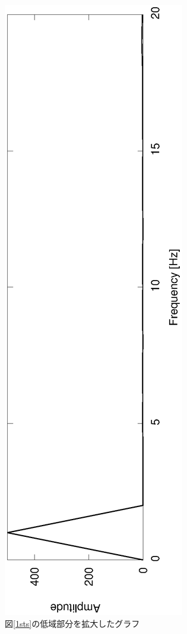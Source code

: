 \documentclass[a4j]{jsarticle}
\begin{document}
\begin{figure}[H]
 \centering
 \vspace{-4cm}
 \hspace{-2cm}
 \includegraphics[angle=-90,scale=0.6]{1stout_spec_kakudai.eps}
  \vspace{-2cm}
 \caption{図\ref{1sts}の低域部分を拡大したグラフ}
 \label{1stsk}
\end{figure}
\end{document}
